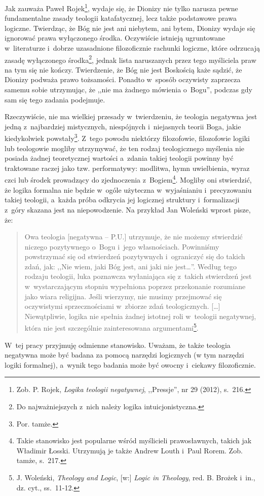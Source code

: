 Jak zauważa Paweł Rojek\footnote{Zob. P. Rojek, \textit{Logika teologii negatywnej}, ,,Pressje'', nr 29 (2012), s.~216.}, wydaje się, że Dionizy nie tylko narusza pewne fundamentalne zasady teologii katafatycznej, lecz także podstawowe prawa logiczne. Twierdząc, że Bóg nie jest ani niebytem, ani bytem, Dionizy wydaje się ignorować prawa wyłączonego środka. Oczywiście istnieją ugruntowane w~literaturze i~dobrze uzasadnione filozoficznie rachunki logiczne, które odrzucają zasadę wyłączonego środka\footnote{Do najważniejszych z~nich należy logika intuicjonistyczna.}, jednak lista naruszanych przez tego myśliciela praw na tym się nie kończy. Twierdzenie, że Bóg nie jest Boskością każe sądzić, że Dionizy podważa prawo tożsamości. Ponadto w~sposób oczywisty zaprzecza samemu sobie utrzymując, że ,,nie ma żadnego mówienia o~Bogu'', podczas gdy sam się tego zadania podejmuje.

Rzeczywiście, nie ma wielkiej przesady w~twierdzeniu, że teologia negatywna jest jedną z~najbardziej mistycznych, niespójnych i~niejasnych teorii Boga, jakie kiedykolwiek powstały\footnote{Por. tamże. }. Z~tego powodu niektórzy filozofowie, filozofowie logiki lub teologowie mogliby utrzymywać, że ten rodzaj teologicznego myślenia nie posiada żadnej teoretycznej wartości a~zdania takiej teologii powinny być traktowane raczej jako tzw. performatywy: modlitwa, hymn uwielbienia, wyraz czci lub środek prowadzący do zjednoczenia z~Bogiem\footnote{Takie stanowisko jest popularne wśród myślicieli prawosławnych, takich jak Władimir Łosski. Utrzymują je także Andrew Louth i~Paul Rorem. Zob. tamże, s.~217.}. Mogliby oni stwierdzić, że logika formalna nie będzie w~ogóle użyteczna w~wyjaśnianiu i~precyzowaniu takiej teologii, a~każda próba odkrycia jej logicznej struktury i~formalizacji z~góry skazana jest na niepowodzenie. Na przykład Jan Woleński wprost pisze, że:

\begin{quote}
Owa teologia [negatywna -- P.U.] utrzymuje, że nie możemy stwierdzić niczego pozytywnego o~Bogu i~jego własnościach. Powinniśmy powstrzymać się od stwierdzeń pozytywnych i~ograniczyć się do takich zdań, jak: ,,Nie wiem, jaki Bóg jest, ani jaki nie jest\ldots''. Według tego rodzaju teologii, luka poznawcza wyłaniająca się z~takich stwierdzeń jest w~wystarczającym stopniu wypełniona poprzez przekonanie rozumiane jako wiara religijna. Jeśli wierzymy, nie musimy przejmować się oczywistymi sprzecznościami w~zbiorze zdań teologicznych. [\ldots] Niewątpliwie, logika nie spełnia żadnej istotnej roli w~teologii negatywnej, która nie jest szczególnie zainteresowana argumentami\footnote{J. Woleński, \textit{Theology and Logic}, [w:] \textit{Logic in Theology}, red. B. Brożek i~in., dz. cyt., ss.~11-12.}.
\end{quote}
W~tej pracy przyjmuję odmienne stanowisko. Uważam, że także teologia negatywna może być badana za pomocą narzędzi logicznych (w tym narzędzi logiki formalnej), a~wynik tego badania może być owocny i~ciekawy filozoficznie.

